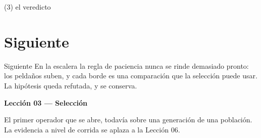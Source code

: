 \begin{frame}[fragile]{(3) el veredicto}

\end{frame}


\section{Siguiente}

\begin{frame}{Siguiente}
En la escalera la regla de paciencia nunca se rinde demasiado pronto: los peldaños suben, y cada borde es una comparación que la selección puede usar. La hipótesis queda refutada, y se conserva.

\vspace{0.8em}
\textbf{Lección 03 --- Selección}

El primer operador que se abre, todavía sobre una generación de una población. La evidencia a nivel de corrida se aplaza a la Lección 06.
\end{frame}

